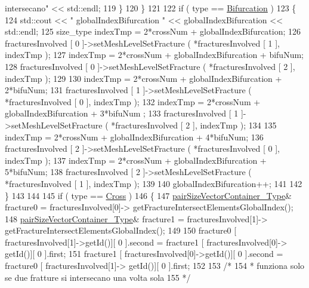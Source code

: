 \begin{DoxyCode}
{       intersecano"} << std::endl;
119                \}
120            \}
121 
122            \textcolor{keywordflow}{if} ( type == \hyperlink{classFractureIntersect_a9a4e4a784fa4c8e359767ed543f89dc5a4d466b3d3de0af7e18732b6f765bb1af}{Bifurcation} )
123            \{
124                std::cout << \textcolor{stringliteral}{" globalIndexBifurcation "} << globalIndexBifurcation << std::endl;
125                size\_type indexTmp = 2*crossNum + globalIndexBifurcation;
126                fracturesInvolved [ 0 ]->setMeshLevelSetFracture ( *fracturesInvolved [ 1 ], indexTmp );
127                indexTmp = 2*crossNum + globalIndexBifurcation + bifuNum;
128                fracturesInvolved [ 0 ]->setMeshLevelSetFracture ( *fracturesInvolved [ 2 ], indexTmp );
129 
130                indexTmp = 2*crossNum + globalIndexBifurcation + 2*bifuNum;
131                fracturesInvolved [ 1 ]->setMeshLevelSetFracture ( *fracturesInvolved [ 0 ], indexTmp );
132                indexTmp = 2*crossNum + globalIndexBifurcation + 3*bifuNum ;
133                fracturesInvolved [ 1 ]->setMeshLevelSetFracture ( *fracturesInvolved [ 2 ], indexTmp );
134 
135                indexTmp = 2*crossNum + globalIndexBifurcation + 4*bifuNum;
136                fracturesInvolved [ 2 ]->setMeshLevelSetFracture ( *fracturesInvolved [ 0 ], indexTmp );
137                indexTmp = 2*crossNum + globalIndexBifurcation + 5*bifuNum;
138                fracturesInvolved [ 2 ]->setMeshLevelSetFracture ( *fracturesInvolved [ 1 ], indexTmp );
139 
140                globalIndexBifurcation++;
141 
142            \}
143 
144 
145         \textcolor{keywordflow}{if} ( type == \hyperlink{classFractureIntersect_a9a4e4a784fa4c8e359767ed543f89dc5a743fef1af81c0e61412fafb9438b380e}{Cross} )
146         \{
147             \hyperlink{Core_8h_a9bc476e433f99b82a9c2b8560735c7b5}{pairSizeVectorContainer\_Type}& fracture0 = fracturesInvolved[0]->
      getFractureIntersectElementsGlobalIndex();
148             \hyperlink{Core_8h_a9bc476e433f99b82a9c2b8560735c7b5}{pairSizeVectorContainer\_Type}& fracture1 = fracturesInvolved[1]->
      getFractureIntersectElementsGlobalIndex();
149 
150             fracture0 [ fracturesInvolved[1]->getId()][ 0 ].second = fracture1 [ fracturesInvolved[0]->
      getId()][ 0 ].first;
151             fracture1 [ fracturesInvolved[0]->getId()][ 0 ].second = fracture0 [ fracturesInvolved[1]->
      getId()][ 0 ].first;
152 
153             \textcolor{comment}{/*}
154 \textcolor{comment}{             * funziona solo se due fratture si intersecano una volta sola}
155 \textcolor{comment}{             */}

\end{DoxyCode}
